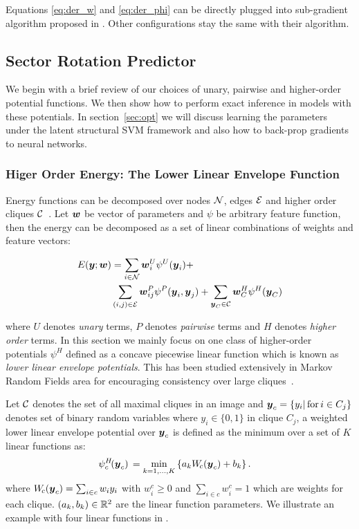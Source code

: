 \documentclass[sigconf,anonymous,review]{acmart}
\renewcommand{\cite}{\citep}
\begin{document}
Equations \eqref{eq:der_w} and \eqref{eq:der_phi} can be directly plugged
into sub-gradient algorithm proposed in \cite{witoonchart2017application}.
Other configurations stay the same with their algorithm.

\subsection{Sector Rotation Predictor}
\label{sec:srp}

We begin with a brief review of our choices of unary, pairwise
and higher-order potential functions. We then show how to perform
exact inference in models with these potentials. In
section~\ref{sec:opt} we will discuss learning the
parameters under the latent structural SVM framework and also how
to back-prop gradients to neural networks.


\subsubsection{Higer Order Energy: The Lower Linear Envelope Function}
\label{sec:llep}

Energy functions can be decomposed over nodes $\N$, edges $\E$
and higher order cliques $\cal C$~\cite{Szummer:ECCV08}. Let
${\boldsymbol{w}}$ be vector of parameters and $\psi$ be arbitrary feature
function, then the energy can be decomposed as a set of linear
combinations of weights and feature vectors:

\begin{align}
  \label{eq:energyfunction_UPH}
  E(\by;\bw)&=\sum_{i\in \N}{\bw_i^U\psi^U(\by_i)}+ \notag\\
  & \sum_{(i,j)\in \E}{\bw_{ij}^P\psi^P(\by_i,\by_j)}+
  \sum_{\by_C\in \cal C}{\bw_C^H\psi^H(\by_C)}
\end{align}

\noindent where $U$ denotes \emph{unary} terms, $P$ denotes
\emph{pairwise} terms and $H$ denotes \emph{higher order} terms.
In this section we mainly focus on one class of higher-order
potentials $\psi^H$ defined as a concave piecewise linear
function which is known as \emph{lower linear envelope
  potentials}. This has been studied extensively in Markov Random
Fields area for encouraging consistency over large
cliques~\cite{Kohli:CVPR07,Nowozin:2011,Gould:ICML2011}.

Let $\cal C$ denotes the set of all maximal cliques in an image
and ${\boldsymbol{y}}_c=\{y_i |\text{\,for\,} i \in C_j\}$ denotes set of
binary random variables where $y_i\in \{0,1\}$ in clique $C_j$, a
weighted lower linear envelope potential over ${\boldsymbol{y}}_c$ is defined
as the minimum over a set of $K$ linear functions as:
%
\begin{align}
  \psi^H_c\!({\boldsymbol{y}}_c) \, &= \min_{k=1, \ldots, K} \left\{ a_k W_{\!c}({\boldsymbol{y}}_c) + b_k \right\}.
  \label{eqn:potential2}
\end{align}
%
where $W_{\!c}({\boldsymbol{y}}_c) = \sum_{i \in c} w_i y_i$ with $w^c_i \geq
0$ and $\sum_{i \in c} w^c_i = 1$ which are weights for each
clique. $(a_k, b_k) \in \mathbb{R}^2$ are the linear function
parameters. We illustrate an example with
four linear functions in .
\end{document}
